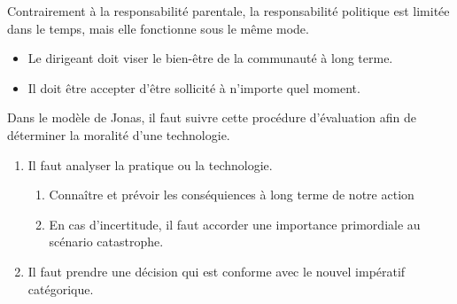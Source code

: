 \documentclass[11pt]{article}
\begin{document}
Contrairement à la responsabilité parentale, la responsabilité politique est limitée dans le temps, mais elle fonctionne sous le même mode.
\begin{itemize}  
\item Le dirigeant doit viser le bien-être de la communauté à long terme.
\item Il doit être accepter d'être sollicité à n'importe quel moment.
\end{itemize}

Dans le modèle de Jonas, il faut suivre cette procédure d'évaluation afin de déterminer la moralité d'une technologie.
\begin{enumerate}
\item Il faut analyser la pratique ou la technologie.
\begin{enumerate}
  \item Connaître et prévoir les conséquiences à long terme de notre action
  \item En cas d'incertitude, il faut accorder une importance primordiale au scénario catastrophe.
\end{enumerate}
\item Il faut prendre une décision qui est conforme avec le nouvel impératif catégorique.
\end{enumerate}
\end{document}
